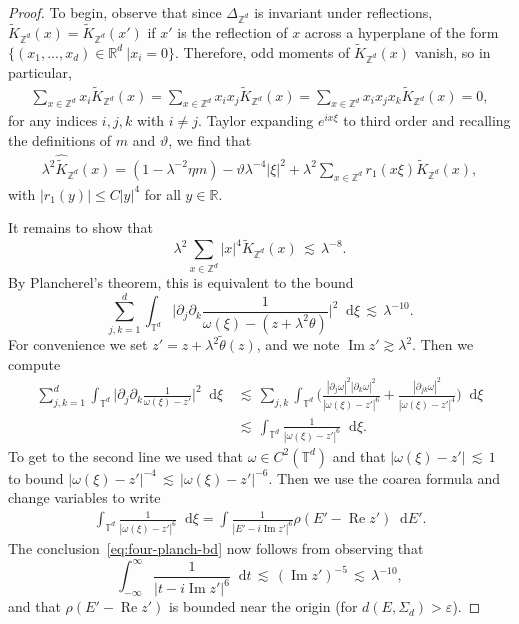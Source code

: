 \documentclass[11pt]{amsart}
\def\Real{{\mathbb R}}
\def\bbZ{{\mathbb Z}}
\def\Torus{{\mathbb T}}
\def\eps{{\varepsilon}}
\newcommand{\diff}{\mathop{}\!\mathrm{d}}
\newcommand{\Impt}{\operatorname*{Im}}
\newcommand{\Rept}{\operatorname*{Re}}
\def\lsim{{\,\lesssim\,}}
\numberwithin{equation}{section}
\numberwithin{theorem}{section}
\begin{document}
\begin{proof}
To begin, observe that since $\Delta_{\mathbb{Z}^d}$ is invariant under reflections,
$\tilde{K}_{\mathbb{Z}^d}(x)=\tilde{K}_{\mathbb{Z}^d}(x')$ if $x'$ is the reflection of $x$ across a hyperplane of
the form $\{(x_1,...,x_d)\in \mathbb{R}^d\ | x_i = 0\}$.
Therefore, odd moments of $\tilde{K}_{\mathbb{Z}^d}(x)$ vanish, so in particular,
\begin{align*}
	\sum_{x\in \bbZ^{d}}x_i\tilde{K}_{\mathbb{Z}^d}(x)=\sum_{x\in \bbZ^{d}}x_ix_j\tilde{K}_{\mathbb{Z}^d}(x)=\sum_{x\in \bbZ^{d}}x_ix_jx_k\tilde{K}_{\mathbb{Z}^d}(x)=0,
\end{align*}
for any indices $i,j,k$ with $i\neq j$. Taylor expanding $e^{ix\xi}$ to third order and recalling the definitions of $m$ and $\vartheta$, we find that
\begin{align*}
\lambda^2\hat{\tilde{K}}_{\mathbb{Z}^d}(x)=(1-\lambda^{-2}\eta m)-\vartheta\lambda^{-4}|\xi|^{2} +\lambda^{2}\sum_{x\in\bbZ^{d}}r_1(x\xi)\tilde{K}_{\mathbb{Z}^d}(x),
\end{align*}
with $|r_{1}(y)|\leq C|y|^{4}$ for all $y\in \Real$.

It remains to show that
\[
\lambda^2 \sum_{x\in\bbZ^d} |x|^4 \tilde{K}_{\mathbb{Z}^d}(x)
\lsim \lambda^{-8}.
\]
By Plancherel's theorem, this is equivalent to the bound
\begin{equation}
\label{eq:four-planch-bd}
\sum_{j,k=1}^d\int_{\Torus^d} \Big|\partial_j\partial_k \frac{1}{\omega(\xi)- (z+ \lambda^2\theta)}\Big|^2 \diff \xi
\lsim \lambda^{-10}.
\end{equation}
For convenience we set $z' = z +\lambda^2\tilde{\theta}(z) $, and we note $\Impt z' \gtrsim \lambda^2$.
Then we compute
\begin{align*}
\sum_{j,k=1}^d\int_{\Torus^d} \Big|\partial_j\partial_k \frac{1}{\omega(\xi)-z'}\Big|^2 \diff \xi
&\lsim \sum_{j,k} \int_{\Torus^d} \Big( \frac{|\partial_j \omega|^2 |\partial_k\omega|^2}{|\omega(\xi)-z'|^6}
+ \frac{|\partial_{jk}\omega|^2}{|\omega(\xi)-z'|^4}\Big)\diff \xi \\
&\lsim \int_{\Torus^d} \frac{1}{|\omega(\xi)-z'|^6} \diff \xi.
\end{align*}
To get to the second line we used that $\omega\in C^2(\Torus^d)$ and that $|\omega(\xi)-z'|\lsim 1$ to bound $|\omega(\xi)-z'|^{-4} \lsim |\omega(\xi)-z'|^{-6}$.  Then we use the coarea formula and change variables to write
\begin{align*}
\int_{\Torus^d} \frac{1}{|\omega(\xi)-z'|^6}
\diff \xi
= \int \frac{1}{|E'-i\Impt z'|^6}\rho(E'-\Rept z')\diff E'.
\end{align*}
The conclusion~\eqref{eq:four-planch-bd} now follows from observing that
\[
\int_{-\infty}^\infty
\frac{1}{|t-i\Impt z'|^6} \diff t
\lsim (\Impt z')^{-5} \lsim \lambda^{-10},
\]
and that $\rho(E'-\Rept z')$ is bounded near the origin (for $d(E,\Sigma_d)>\eps$).

\end{proof}
\end{document}
